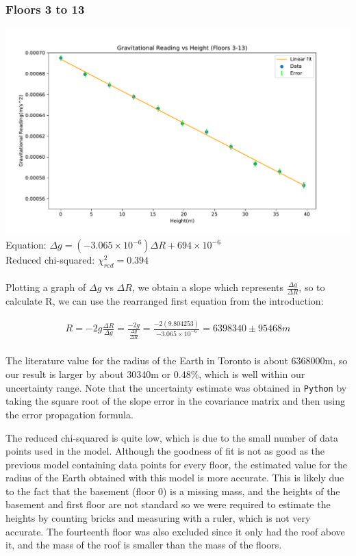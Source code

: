 \documentclass[a4paper, 11pt]{article}
\begin{document}
\subsubsection*{Floors 3 to 13}
\includegraphics[width=\textwidth]{gravity-height2.pdf}
\\
Equation: $\Delta g = (-3.065\times10^{-6})\Delta R + 694 \times 10^{-6}$
\\
Reduced chi-squared: $\chi^{2}_{red} = 0.394$ \\
\\
Plotting a graph of $\Delta g$ vs $\Delta R$, we obtain a slope which represents $\frac{\Delta g}{\Delta R}$, so to calculate R, we can use the rearranged first equation from the introduction:

\begin{align*}
R = -2g\frac{\Delta R}{\Delta g} = \frac{-2g}{\frac{\Delta g}{\Delta R}} = \frac{-2(9.804253)}{-3.065\times10^{-6}} = 6398340 \pm 95468m
\end{align*}
\\
The literature value for the radius of the Earth in Toronto is about 6368000m, so our result is larger by about 30340m or 0.48\%, which is well within our uncertainty range. Note that the uncertainty estimate was obtained in \texttt{Python} by taking the square root of the slope error in the covariance matrix and then using the error propagation formula.

The reduced chi-squared is quite low, which is due to the small number of data points used in the model. Although the goodness of fit is not as good as the previous model containing data points for every floor, the estimated value for the radius of the Earth obtained with this model is more accurate. This is likely due to the fact that the basement (floor 0) is a missing mass, and the heights of the basement and first floor are not standard so we were required to estimate the heights by counting bricks and measuring with a ruler, which is not very accurate. The fourteenth floor was also excluded since it only had the roof above it, and the mass of the roof is smaller than the mass of the floors.
\end{document}
